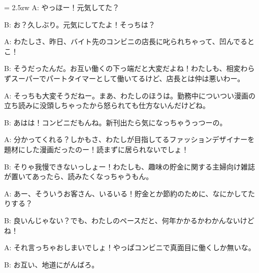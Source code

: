\documentclass[11pt]{amsart}
\title{}
\author{}
\newenvironment{hangall}[1]{\hangindent = 2.5zw\everypar{\hangindent = 2.5zw}}{}
\begin{document}
\maketitle
\begin{hangall}{}%
A: やっほー！元気してた？



B: お？久しぶり。元気にしてたよ！そっちは？



A: わたしさ、昨日、バイト先のコンビニの店長に叱られちゃって、凹んでるとこ！



B: そうだったんだ。お互い働くの下っ端だと大変だよね！わたしも、相変わらずスーパーでパートタイマーとして働いてるけど、店長とは仲は悪いわー。



A: そっちも大変そうだねー。まあ、わたしのほうは。勤務中についつい漫画の立ち読みに没頭しちゃったから怒られても仕方ないんだけどね。



B: あはは！コンビニだもんね。新刊出たら気になっちゃうっつーの。



A: 分かってくれる？しかもさ、わたしが目指してるファッションデザイナーを題材にした漫画だったのー！読まずに居られないでしょ！



B: そりゃ我慢できないっしょー！わたしも、趣味の貯金に関する主婦向け雑誌が置いてあったら、読みたくなっちゃうもん。



A: あー、そういうお客さん、いるいる！貯金とか節約のために、なにかしてたりする？



B: 良いんじゃない？でも、わたしのペースだと、何年かかるかわかんないけどね！



A: それ言っちゃおしまいでしょ！やっぱコンビニで真面目に働くしか無いな。



B: お互い、地道にがんばろ。\end{hangall}
\end{document}
